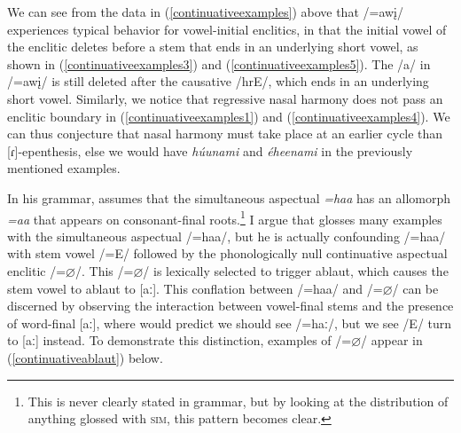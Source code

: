 We can see from the data in (\ref{continuativeexamples}) above that /=awį/ experiences typical behavior for vowel-initial enclitics, in that the initial vowel of the enclitic deletes before a stem that ends in an underlying short vowel, as shown in (\ref{continuativeexamples3}) and (\ref{continuativeexamples5}). The /a/ in /=awį/ is still deleted after the causative /hrE/, which ends in an underlying short vowel. Similarly, we notice that regressive nasal harmony does not pass an enclitic boundary in (\ref{continuativeexamples1}) and (\ref{continuativeexamples4}). We can thus conjecture that nasal harmony must take place at an earlier cycle than [ɾ]-epenthesis, else we would have \textit{húunami} and \textit{éheenami} in the previously mentioned examples.

\label{ParaContinuative2}\label{Ch3SubSubContinuative2}

In his grammar, \citet{mixco1997a} assumes that the simultaneous aspectual \textit{=haa} has an allomorph \textit{=aa} that appears on consonant-final roots.\footnote{This is never clearly stated in  grammar, but by looking at the distribution of anything glossed with \textsc{sim}, this pattern becomes clear.} I argue that \citet{mixco1997a,mixco1997b} glosses many examples with the simultaneous aspectual /=haa/, but he is actually confounding /=haa/ with stem vowel /=E/ followed by the phonologically null continuative aspectual enclitic /=$\varnothing$/. This /=$\varnothing$/ is lexically selected to trigger ablaut, which causes the stem vowel to ablaut to [aː]. This conflation between /=haa/ and /=$\varnothing$/ can be discerned by observing the interaction between vowel-final stems and the presence of word-final [aː], where \citet{mixco1997a} would predict we should see /=haː/, but we see /E/ turn to [aː] instead. To demonstrate this distinction, examples of /=$\varnothing$/ appear in (\ref{continuativeablaut}) below.



